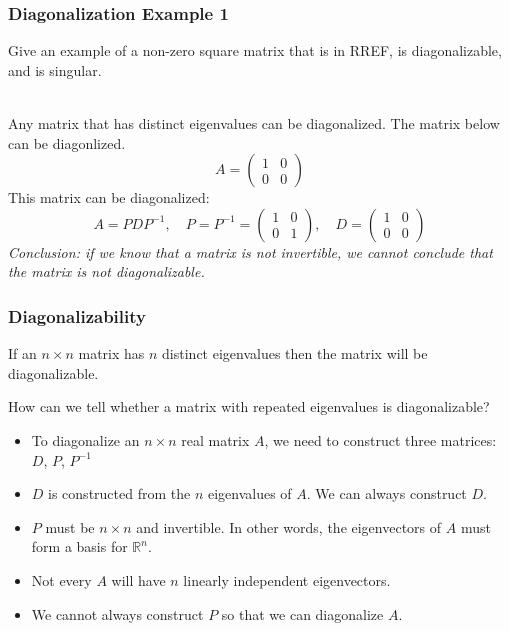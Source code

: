 \begin{frame}\frametitle{Diagonalization Example 1}
    
    Give an example of a non-zero square matrix that is in RREF, is diagonalizable, and is singular. 

    \vspace{4pt}
    \\ 
    Any matrix that has distinct eigenvalues can be diagonalized. \pause The matrix below can be diagonlized. 
    $$A = \begin{pmatrix} 1 & 0 \\ 0 & 0 \end{pmatrix}$$
    \pause This matrix can be diagonalized: 
    $$A = PDP^{-1}, \quad P = P^{-1} = \begin{pmatrix} 1 & 0 \\ 0 & 1 \end{pmatrix}, \quad D = \begin{pmatrix} 1 & 0 \\0 & 0 \end{pmatrix}$$
    \pause \textit{Conclusion: if we know that a matrix is not invertible, we cannot conclude that the matrix is not diagonalizable.}
\end{frame}




\begin{frame}
\frametitle{Diagonalizability}
    If an $n\times n$ matrix has $n$ distinct eigenvalues then the matrix will be diagonalizable. 
    
    \vspace{12pt}
    
    How can we tell whether a matrix with repeated eigenvalues is diagonalizable? 
    
    \pause
    \begin{itemize}
        \item<2-> To diagonalize an $n\times n$ real matrix $A$, we need to construct three matrices: $D$, $P$, $P^{-1}$
        \item<3-> $D$ is constructed from the $n$ eigenvalues of $A$. We can always construct $D$. 
        \item<4-> $P$ must be $n\times n$ and invertible. In other words, the eigenvectors of $A$ must form a basis for $\mathbb R^n$.
        \item<5-> Not every $A$ will have $n$ linearly independent eigenvectors. 
        \item<6-> We cannot always construct $P$ so that we can diagonalize $A$.
        
    \end{itemize}

\end{frame}




